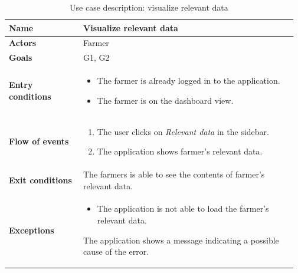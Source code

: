 \begin{table}[H]
    \centering
	\begin{tabular}{@{}p{0.25\linewidth} p{0.72\linewidth}@{}}
\toprule
		\textbf{Name}               & Visualize relevant data \todo{discuss UC changes}\\
		\midrule
		\textbf{Actors}             & Farmer\\
		\midrule
		\textbf{Goals}              & G1, G2 \\
		\midrule
		
		\textbf{Entry conditions}   & \begin{itemize}[leftmargin=.4cm,noitemsep,topsep=0pt,before=\vspace{-3mm},after=\vspace{-4mm}]
		    \item The farmer is already logged in to the application.
		    \item The farmer is on the dashboard view.
		\end{itemize}\\
		\midrule
		
		\textbf{Flow of events}     & \begin{enumerate}[leftmargin=.4cm,noitemsep,topsep=0pt,before=\vspace{-3mm},after=\vspace{-4mm}]
		    \item The user clicks on \textit{Relevant data} in the sidebar.
		    \item The application shows farmer's relevant data.
		\end{enumerate}\\
		\midrule
		\textbf{Exit conditions}    & The farmers is able to see the contents of farmer's relevant data. \\
		\midrule
		
		\textbf{Exceptions}         & 
	    \begin{itemize}[leftmargin=.4cm,noitemsep,topsep=0pt,before=\vspace{-3mm}]
		   \item The application is not able to load the farmer's relevant data.
		\end{itemize}
		The application shows a message indicating a possible cause of the error.
		\\\bottomrule
	\end{tabular}
	\caption{Use case description: visualize relevant data} 
\end{table}


